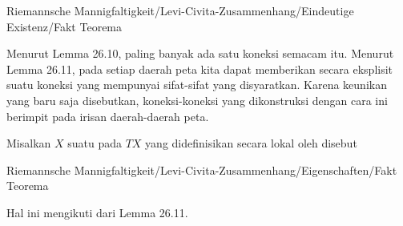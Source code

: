 {Riemannsche Mannigfaltigkeit/Levi-Civita-Zusammenhang/Eindeutige Existenz/Fakt}
{Teorema}
{}
{

\faktfolgerung {}
\faktzusatz {}
\faktzusatz {}

}
{

Menurut
Lemma 26.10,
paling banyak ada satu koneksi semacam itu. Menurut
Lemma 26.11,
pada setiap daerah peta kita dapat memberikan secara eksplisit suatu koneksi yang mempunyai sifat-sifat yang disyaratkan. Karena keunikan yang baru saja disebutkan, koneksi-koneksi yang dikonstruksi dengan cara ini berimpit pada irisan daerah-daerah peta.

}

{}
{

Misalkan $X$ suatu
pada
$TX$ yang didefinisikan secara lokal oleh
disebut

}



{Riemannsche Mannigfaltigkeit/Levi-Civita-Zusammenhang/Eigenschaften/Fakt}
{Teorema}
{}
{

\faktzusatz {}
\faktzusatz {}

}
{

Hal ini mengikuti dari
Lemma 26.11.

}



